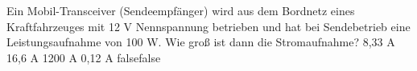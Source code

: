    {Ein Mobil-Transceiver (Sendeempfänger) wird aus dem Bordnetz eines Kraftfahrzeuges mit 12 V Nennspannung betrieben und hat bei Sendebetrieb eine Leistungsaufnahme von 100 W. Wie groß ist dann die Stromaufnahme?}
    {8,33 A}
    {16,6 A}
    {1200 A}
    {0,12 A}
    {false}{false}